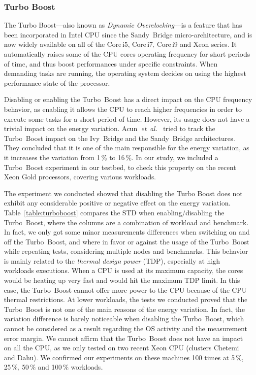 \subsubsection{Turbo Boost}
The Turbo Boost---also known as \emph{Dynamic Overclocking}---is a feature that has been incorporated in Intel CPU since the Sandy~Bridge micro-architecture, and is now widely available on all of the Core\,i5, Core\,i7, Core\,i9 and Xeon series.
It automatically raises some of the CPU cores operating frequency for short periods of time, and thus boost performances under specific constraints.
When demanding tasks are running, the operating system decides on using the highest performance state of the processor.

Disabling or enabling the Turbo~Boost has a direct impact on the CPU frequency behavior, as enabling it allows the CPU to reach higher frequencies in order to execute some tasks for a short period of time.
However, its usage does not have a trivial impact on the energy variation.
Acun~\emph{et~al.}~\cite{acun_variation_2016} tried to track the Turbo~Boost impact on the Ivy~Bridge and the Sandy~Bridge architectures.
They concluded that it is one of the main responsible for the energy variation, as it increases the variation from 1\,\% to 16\,\%.
In our study, we included a Turbo~Boost experiment in our testbed, to check this property on the recent Xeon Gold processors, covering various workloads.

The experiment we conducted showed that disabling the Turbo Boost does not exhibit any considerable positive or negative effect on the energy variation.
Table~\ref{table:turboboost} compares the STD when enabling/disabling the Turbo~Boost, where the columns are a combination of workload and benchmark.
In fact, we only got some minor measurements differences when switching on and off the Turbo~Boost, and where in favor or against the usage of the Turbo~Boost while repeating tests, considering multiple nodes and benchmarks.
This behavior is mainly related to the \emph{thermal design power} (TDP), especially at high workloads executions.
When a CPU is used at its maximum capacity, the cores would be heating up very fast and would hit the maximum TDP limit.
In this case, the Turbo~Boost cannot offer more power to the CPU because of the CPU thermal restrictions.
At lower workloads, the tests we conducted proved that the Turbo~Boost is not one of the main reasons of the energy variation.
In fact, the variation difference is barely noticeable when disabling the Turbo~Boost, which cannot be considered as a result regarding the OS activity and the measurement error margin.
We cannot affirm that the Turbo~Boost does not have an impact on all the CPU, as we only tested on two recent Xeon CPU (clusters \textsf{Chetemi} and \textsf{Dahu}).
We confirmed our experiments on these machines 100 times at 5\,\%, 25\,\%, 50\,\% and 100\,\% workloads.


